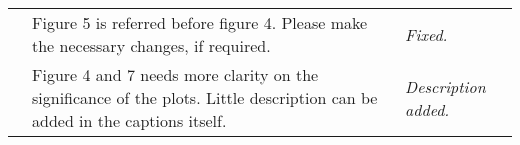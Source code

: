 \documentclass{article}
\begin{document}
\begin{table}
\begin{tabular}{ |c|p{9cm}|p{5cm}| }
		                   & Figure 5 is referred before figure 4. Please make the necessary changes, if required.                                                                                                                                                                                                                                                                                                                                      & \textit{Fixed.}                                                                                                                             \\ \cline{2-3}
		                   & Figure 4 and 7 needs more clarity on the significance of the plots. Little description can be added in the captions itself.                                                                                                                                                                                                                                                                                                & \textit{Description added.}                                                                                                                 \\ \hline
	\end{tabular}
\end{table}


%	      
%	      
%	      
\end{document}

